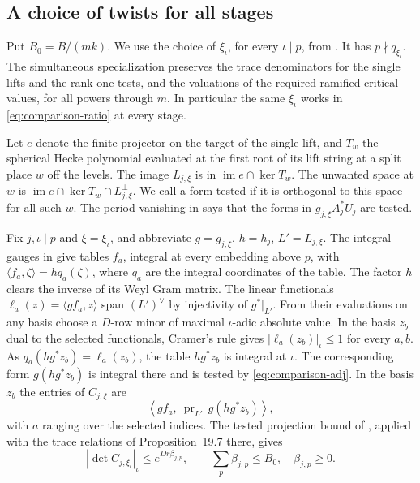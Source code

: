 \documentclass[11pt,reqno]{amsart}
\theoremstyle{definition}
\numberwithin{equation}{section}
\begin{document}
\subsection{A choice of twists for all stages}

Put \(B_0=B/(mk)\).
We use the choice of \(\xi_\iota\), for every \(\iota\mid p\),
from \cite[Proposition~20.15]{chojecki}. It has \(p\nmid q_{\xi_\iota}\).
The simultaneous specialization preserves the trace denominators
for the single lifts and the rank-one tests, and the valuations
of the required ramified critical values, for all powers through
\(m\). In particular the same \(\xi_\iota\) works in
\eqref{eq:comparison-ratio} at every stage.

Let \(e\) denote the finite projector on the target of the
single lift, and \(T_w\) the spherical Hecke polynomial
evaluated at the first root of its lift string at a split
place \(w\) off the levels. The image \(L_{j,\xi}\) is in
\(\operatorname{im}e\cap\ker T_w\). The unwanted space at \(w\)
is \(\operatorname{im}e\cap\ker T_w\cap L_{j,\xi}^\perp\).
We call a form tested if it is orthogonal to this space
for all such \(w\). The period vanishing in
\cite[Propositions~14.10 and~19.17]{chojecki} says that
the forms in \(g_{j,\xi}A_j^*U_j\) are tested.

Fix \(j,\iota\mid p\) and \(\xi=\xi_\iota\), and abbreviate
\(g=g_{j,\xi}\), \(h=h_j\), \(L'=L_{j,\xi}\).
The integral gauges in \cite[\S14.5]{chojecki} give tables \(f_a\),
integral at every embedding above \(p\), with
\(\langle f_a,\zeta\rangle=h q_a(\zeta)\), where \(q_a\) are the
integral coordinates of the table. The factor \(h\) clears
the inverse of its Weyl Gram matrix. The linear functionals
\(\ell_a(z)=\langle g f_a,z\rangle\) span \((L')^\vee\)
by injectivity of \(g^*|_{L'}\).
From their evaluations on any basis choose a \(D\)-row minor
of maximal \(\iota\)-adic absolute value. In the basis \(z_b\)
dual to the selected functionals, Cramer's rule gives
\(|\ell_a(z_b)|_\iota\le1\) for every \(a,b\).
As \(q_a(hg^*z_b)=\ell_a(z_b)\), the table \(hg^*z_b\) is
integral at \(\iota\). The corresponding form \(g(hg^*z_b)\)
is integral there and is tested by \eqref{eq:comparison-adj}.
In the basis \(z_b\) the entries of \(C_{j,\xi}\) are
\[
 \left\langle g f_a,\ \operatorname{pr}_{L'}\,g(hg^*z_b)\right\rangle,
\]
with \(a\) ranging over the selected indices. The tested
projection bound of \cite[Proposition~19.13]{chojecki},
applied with the trace relations of Proposition~19.7 there,
gives
\begin{equation}\label{eq:compressed-finite}
 |\det C_{j,\xi_\iota}|_\iota\le e^{Dr\beta_{j,p}},
 \qquad \sum_p\beta_{j,p}\le B_0,\quad\beta_{j,p}\ge0 .
\end{equation}
\end{document}

